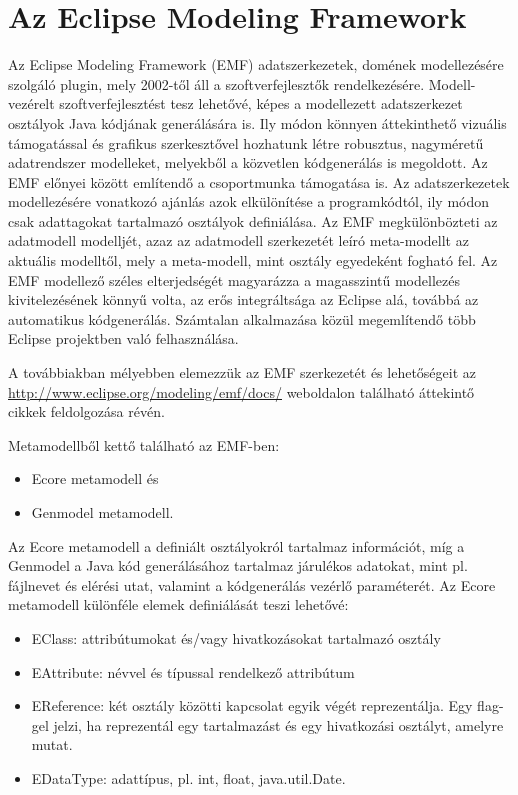 
\section{Az Eclipse Modeling Framework} \cite{VogelEMF}
Az Eclipse Modeling Framework (EMF) adatszerkezetek, domének modellezésére szolgáló plugin, mely 2002-től áll a szoftverfejlesztők rendelkezésére. Modell-vezérelt szoftverfejlesztést tesz lehetővé, képes a modellezett adatszerkezet osztályok Java kódjának generálására is. Ily módon könnyen áttekinthető vizuális támogatással és grafikus szerkesztővel hozhatunk létre robusztus, nagyméretű adatrendszer modelleket, melyekből a közvetlen kódgenerálás is megoldott. Az EMF előnyei között említendő a csoportmunka támogatása is. Az adatszerkezetek modellezésére vonatkozó ajánlás azok elkülönítése a programkódtól, ily módon csak adattagokat tartalmazó osztályok definiálása. 
Az EMF megkülönbözteti az adatmodell modelljét, azaz az adatmodell szerkezetét leíró meta-modellt az aktuális modelltől, mely a meta-modell, mint osztály egyedeként fogható fel. 
Az EMF modellező széles elterjedségét magyarázza a magasszintű modellezés kivitelezésének könnyű volta, az erős integráltsága az Eclipse alá, továbbá az automatikus kódgenerálás. Számtalan alkalmazása közül megemlítendő több Eclipse projektben való felhasználása.

A továbbiakban mélyebben elemezzük az EMF szerkezetét és lehetőségeit az \url{http://www.eclipse.org/modeling/emf/docs/} weboldalon található áttekintő cikkek feldolgozása révén.

Metamodellből kettő található az EMF-ben:
\begin{itemize}
	\item Ecore metamodell és 
	\item Genmodel metamodell.
\end{itemize} 
Az Ecore metamodell a definiált osztályokról tartalmaz információt, míg a Genmodel a Java kód generálásához tartalmaz járulékos adatokat, mint pl. fájlnevet és elérési utat, valamint a kódgenerálás vezérlő paraméterét. Az Ecore metamodell különféle elemek definiálását teszi lehetővé:
\begin{itemize}
	\item EClass: attribútumokat és/vagy hivatkozásokat tartalmazó osztály
	\item EAttribute: névvel és típussal rendelkező attribútum
	\item EReference: két osztály közötti kapcsolat egyik végét reprezentálja. Egy flag-gel jelzi, ha reprezentál egy tartalmazást és egy hivatkozási osztályt, amelyre mutat.
	\item EDataType: adattípus, pl. int, float, java.util.Date.
\end{itemize}

